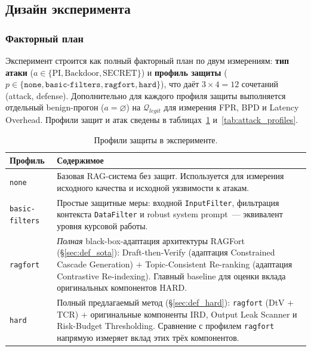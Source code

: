 \documentclass[12pt, a4paper]{article}
\theoremstyle{definition}
\theoremstyle{remark}
\begin{document}
\subsection{Дизайн эксперимента}
\label{sec:experiment_design}

\subsubsection{Факторный план}

Эксперимент строится как полный факторный план по двум измерениям: \textbf{тип атаки} ($a \in \{\text{PI}, \text{Backdoor}, \text{SECRET}\}$) и \textbf{профиль защиты} ($p \in \{\texttt{none}, \texttt{basic-filters}, \texttt{ragfort}, \texttt{hard}\}$), что даёт $3 \times 4 = 12$ сочетаний (attack, defense). Дополнительно для каждого профиля защиты выполняется отдельный benign-прогон ($a = \varnothing$) на $\mathcal{Q}_{legit}$ для измерения FPR, BPD и Latency Overhead. Профили защит и атак сведены в таблицах~\ref{tab:defense_profiles} и~\ref{tab:attack_profiles}.

\begin{table}[H]
\centering
\caption{Профили защиты в эксперименте.}
\label{tab:defense_profiles}
\begin{tabular}{|p{}|p{}|}
\hline
\textbf{Профиль} & \textbf{Содержимое} \\
\hline
\texttt{none} & Базовая RAG-система без защит. Используется для измерения исходного качества и исходной уязвимости к атакам. \\
\hline
\texttt{basic-filters} & Простые защитные меры: входной \texttt{InputFilter}, фильтрация контекста \texttt{DataFilter} и robust system prompt~--- эквивалент уровня курсовой работы. \\
\hline
\texttt{ragfort} & \emph{Полная} black-box-адаптация архитектуры RAGFort~\cite{RAGFort2025} (\S\ref{sec:def_sota}): Draft-then-Verify (адаптация Constrained Cascade Generation) $+$ Topic-Consistent Re-ranking (адаптация Contrastive Re-indexing). Главный baseline для оценки вклада оригинальных компонентов HARD. \\
\hline
\texttt{hard} & Полный предлагаемый метод (\S\ref{sec:def_hard}): \texttt{ragfort} (DtV $+$ TCR) $+$ оригинальные компоненты IRD, Output Leak Scanner и Risk-Budget Thresholding. Сравнение с профилем \texttt{ragfort} напрямую измеряет вклад этих трёх компонентов. \\
\hline
\end{tabular}
\end{table}
\end{document}
